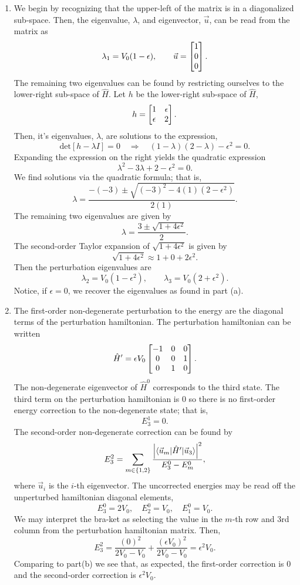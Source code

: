 \documentclass[a4paper, 12pt]{config/homework}
\begin{document}
\begin{enumerate}
\begin{enumerate}[label=(\alph*)]
\pagebreak
\item We begin by recognizing that the upper-left of the matrix is in a diagonalized sub-space. Then, the eigenvalue, \(\lambda\), and eigenvector, \(\vec{u}\), can be read from the matrix as
\[\lambda_1 = V_0(1-\epsilon), \qquad \vec{u}=\left[ \begin{matrix} 1 \\ 0 \\ 0 \end{matrix} \right].\]
The remaining two eigenvalues can be found by restricting ourselves to the lower-right sub-space of \(\hat{H}\). Let \(h\) be the lower-right sub-space of \(\hat{H}\),
\[h = \left[ \begin{matrix} 1 & \epsilon \\ \epsilon & 2 \end{matrix} \right].\]
Then, it's eigenvalues, \(\lambda\), are solutions to the expression,
\[\text{det}\left[h - \lambda I\right] = 0 \quad\Rightarrow\quad \left(1-\lambda\right)(2-\lambda) - \epsilon^2 = 0.\]
Expanding the expression on the right yields the quadratic expression
\[\lambda^2 - 3\lambda + 2 - \epsilon^2 = 0.\]
We find solutions via the quadratic formula; that is,
\[\lambda = \frac{-(-3) \pm \sqrt{(-3)^2 -4(1)(2-\epsilon^2)}}{2(1)}.\]
The remaining two eigenvalues are given by
\[\lambda = \frac{3\pm\sqrt{1+4\epsilon^2}}{2}.\]
The second-order Taylor expansion of \(\sqrt{1+4\epsilon^2}\) is given by
\[\sqrt{1+4\epsilon^2} \approx 1 + 0 + 2\epsilon^2.\]
Then the perturbation eigenvalues are
\[\lambda_2 = V_0\left(1 - \epsilon^2\right), \qquad \lambda_3 = V_0\left(2 + \epsilon^2\right).\]
Notice, if \(\epsilon = 0\), we recover the eigenvalues as found in part (a).

\pagebreak
\item The first-order non-degenerate perturbation to the energy are the diagonal terms of the perturbation hamiltonian. The perturbation hamiltonian can be written
\[\hat{H}' = \epsilon V_0 \left[ \begin{matrix} -1 & 0 & 0 \\ 0 & 0 & 1 \\ 0 & 1 & 0 \end{matrix} \right].\]
The non-degenerate eigenvector of \(\hat{H}^0\) corresponds to the third state. The third term on the perturbation hamiltonian is 0 so there is no first-order energy correction to the non-degenerate state; that is,
\[E_3^1=0.\]
The second-order non-degenerate correction can be found by
\[E_3^2 = \sum_{m\in\{1,2\}}\frac{\left|\bra*{\vec{u}_m}\hat{H}'\ket*{\vec{u}_3}\right|^2}{E_3^0 - E_m^0},\]
where \(\vec{u}_i\) is the \(i\)-th eigenvector. The uncorrected energies may be read off the unperturbed hamiltonian diagonal elements,
\[E_3^0 = 2 V_0, \quad E_2^0 = V_0, \quad E_1^0 = V_0.\]
We may interpret the bra-ket as selecting the value in the \(m\)-th row and 3rd column from the perturbation hamiltonian matrix. Then,
\[E_3^2 = \frac{(0)^2}{2V_0 - V_0} + \frac{(\epsilon V_0)^2}{2V_0 - V_0} = \epsilon^2 V_0.\]
Comparing to part(b) we see that, as expected, the first-order correction is 0 and the second-order correction is \(\epsilon^2 V_0\).


\end{enumerate}
\end{enumerate}
\end{document}
